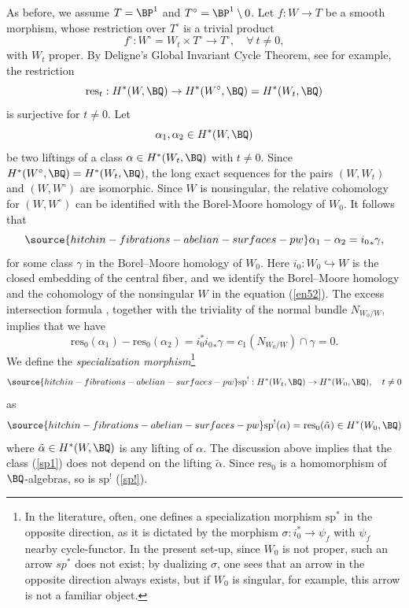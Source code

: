 As before, we assume $T = \BP^1$ and $T^\circ = \BP^1 \setminus 0$. Let $f: W \to T$ be a smooth morphism, whose restriction over $T^\circ$ is a trivial product
\[
f^\circ: W^\circ = W_t \times T^\circ \rightarrow T^\circ, \quad \forall~ t\neq 0,
\]
with $W_t$ proper.
By Deligne's Global Invariant Cycle Theorem, see  \cite[Theorem 1.7.1]{dCM1} for example, the restriction
\[
\mathrm{res}_t:  H^*(W, \BQ) \to  H^*(W^\circ,\BQ)=H^*(W_t, \BQ)
\]
is surjective for $t \neq 0$. Let
\[
\alpha_1, \alpha_2 \in H^*(W, \BQ)
\]
be two liftings of a class $\alpha \in H^*(W_t, \BQ)$ with $t\neq 0$. Since $H^*(W^\circ,\BQ)=H^*(W_t,\BQ)$, the long exact sequences for the pairs $(W,W_t)$ and $(W, W^\circ)$
are isomorphic. Since $W$ is nonsingular, the relative cohomology for $(W,W^\circ)$ can be identified with the Borel-Moore homology of $W_0$. It follows that
\begin{equation}\label{en52}
\source{hitchin-fibrations-abelian-surfaces-pw}
\alpha_1 - \alpha_2 = {i_0}_* \gamma,
\end{equation}
for some class $\gamma$
 in the Borel--Moore homology of $W_0$.  Here $i_0: W_0 \hookrightarrow W$ is the closed embedding of the central fiber, and we identify the Borel--Moore homology and the cohomology of the nonsingular $W$ in the equation (\ref{en52}). The excess intersection formula \cite[Corollary 6.3]{Fulton}, {together with the triviality of the normal bundle $N_{W_0/W}$,} implies that we have
 \[
\mathrm{res}_0(\alpha_1) - \mathrm{res}_0(\alpha_2) = i_0^*{i_0}_* \gamma = c_1(N_{W_0/W})\cap \gamma =0.
\]
We define the \emph{specialization morphism}\footnote{In the literature, often, one defines a specialization morphism  $\mathrm{sp}^*$ in the opposite direction, as it is dictated by the morphism $\sigma: i_0^* \to \psi_f$ with $\psi_f$ nearby cycle-functor. In the present set-up, since $W_0$ is not proper, such an arrow $sp^*$ does not exist;
by dualizing $\sigma$, one sees that an arrow in the opposite direction always exists, but if $W_0$ is singular, for example, this arrow is not a familiar object.}
\begin{equation}\label{sp!}
\source{hitchin-fibrations-abelian-surfaces-pw}
\mathrm{sp}^!: H^*(W_t, \BQ) \rightarrow H^*(W_0, \BQ), \quad t\neq 0
\end{equation}
as
\begin{equation}\label{sp1}
\source{hitchin-fibrations-abelian-surfaces-pw}
\mathrm{sp^!}(\alpha) = \mathrm{res}_0(\tilde{\alpha}) \in H^*(W_0, \BQ)
\end{equation}
where $\tilde{\alpha} \in H^*(W, \BQ)$ is any lifting of $\alpha$. The discussion above implies that the class (\ref{sp1}) does not depend on the lifting $\tilde{\alpha}$. Since $\mathrm{res}_0$ is a homomorphism of $\BQ$-algebras, so is $\mathrm{sp}^!$  (\ref{sp!}).


